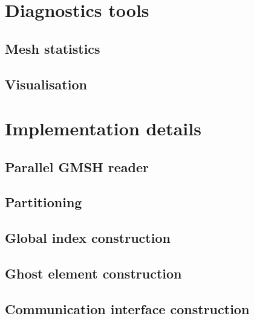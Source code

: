 \documentclass[12pt]{article}
\begin{document}
\section{Diagnostics tools}
\subsection{Mesh statistics}
\subsection{Visualisation}

\section{Implementation details}
\subsection{Parallel GMSH reader}
\subsection{Partitioning}
\subsection{Global index construction}
\subsection{Ghost element construction}
\subsection{Communication interface construction}

%
%


\printindex
\end{document}
